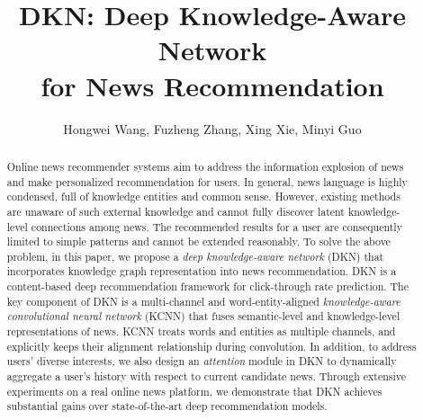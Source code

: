 \documentclass[sigconf]{acmart}
\begin{document}
\title[DKN: Deep Knowledge-Aware Network for News Recommendation]{DKN: Deep Knowledge-Aware Network\\for News Recommendation}


\author{Hongwei Wang, Fuzheng Zhang, Xing Xie, Minyi Guo}


\renewcommand{\shortauthors}{H. Wang et al.}


\begin{abstract}
	Online news recommender systems aim to address the information explosion of news and make personalized recommendation for users.
	In general, news language is highly condensed, full of knowledge entities and common sense.
	However, existing methods are unaware of such external knowledge and cannot fully discover latent knowledge-level connections among news.
	The recommended results for a user are consequently limited to simple patterns and cannot be extended reasonably.
To solve the above problem, in this paper, we propose a \textit{deep knowledge-aware network} (DKN) that incorporates knowledge graph representation into news recommendation.
	DKN is a content-based deep recommendation framework for click-through rate prediction.
	The key component of DKN is a multi-channel and word-entity-aligned \textit{knowledge-aware convolutional neural network} (KCNN) that fuses semantic-level and knowledge-level representations of news.
	KCNN treats words and entities as multiple channels, and explicitly keeps their alignment relationship during convolution.
	In addition, to address users' diverse interests, we also design an \textit{attention} module in DKN to dynamically aggregate a user's history with respect to current candidate news.
	Through extensive experiments on a real online news platform, we demonstrate that DKN achieves substantial gains over state-of-the-art deep recommendation models.
\end{abstract}



\maketitle
\end{document}
